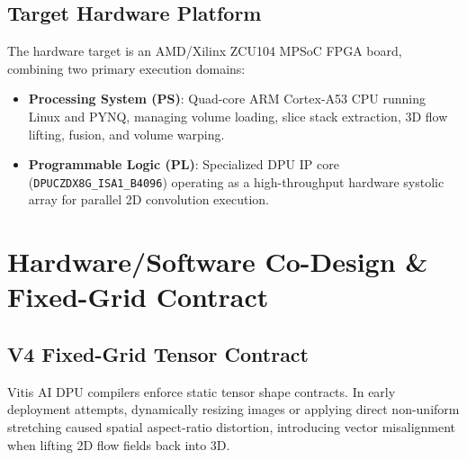 \documentclass[conference]{IEEEtran}
\begin{document}
\subsection{Target Hardware Platform}
The hardware target is an AMD/Xilinx ZCU104 MPSoC FPGA board, combining two primary execution domains:
\begin{itemize}
    \item \textbf{Processing System (PS)}: Quad-core ARM Cortex-A53 CPU running Linux and PYNQ, managing volume loading, slice stack extraction, 3D flow lifting, fusion, and volume warping.
    \item \textbf{Programmable Logic (PL)}: Specialized DPU IP core (\texttt{DPUCZDX8G\_ISA1\_B4096}) operating as a high-throughput hardware systolic array for parallel 2D convolution execution.
\end{itemize}

\section{Hardware/Software Co-Design \& Fixed-Grid Contract}
\label{sec:codesign}

\subsection{V4 Fixed-Grid Tensor Contract}
Vitis AI DPU compilers enforce static tensor shape contracts. In early deployment attempts, dynamically resizing images or applying direct non-uniform stretching caused spatial aspect-ratio distortion, introducing vector misalignment when lifting 2D flow fields back into 3D.
\end{document}
